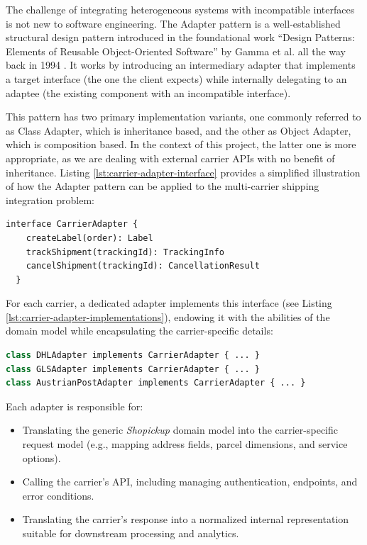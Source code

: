 \documentclass{imc-inf}
\begin{document}
The challenge of integrating heterogeneous systems with incompatible interfaces is not new to software engineering.
The Adapter pattern is a well-established structural design pattern introduced in the foundational work “Design Patterns: Elements of Reusable Object-Oriented Software” by Gamma et al. all the way back in 1994 \cite{gammaDesignPatternsElements1994}.
It works by introducing an intermediary adapter that implements a target interface (the one the client expects) while internally delegating to an adaptee (the existing component with an incompatible interface).

This pattern has two primary implementation variants, one commonly referred to as Class Adapter, which is inheritance based, and the other as Object Adapter, which is composition based.
In the context of this project, the latter one is more appropriate, as we are dealing with external carrier APIs with no benefit of inheritance.
Listing \ref{lst:carrier-adapter-interface} provides a simplified illustration of how the Adapter pattern can be applied to the multi-carrier shipping integration problem:

\begin{lstlisting}[language=Python,caption={Carrier adapter interface pseudocode},label=lst:carrier-adapter-interface]
interface CarrierAdapter {
    createLabel(order): Label
    trackShipment(trackingId): TrackingInfo
    cancelShipment(trackingId): CancellationResult
  }
\end{lstlisting}

For each carrier, a dedicated adapter implements this interface (see Listing \ref{lst:carrier-adapter-implementations}), endowing it with the abilities of the domain model while encapsulating the carrier-specific details:

\begin{lstlisting}[language=Python,caption={Carrier adapter implementation pseudocode},label=lst:carrier-adapter-implementations]
class DHLAdapter implements CarrierAdapter { ... }
class GLSAdapter implements CarrierAdapter { ... }
class AustrianPostAdapter implements CarrierAdapter { ... }
\end{lstlisting}

Each adapter is responsible for:

\begin{itemize}[itemsep=3pt]
  \item Translating the generic \textit{Shopickup} domain model into the carrier-specific request model (e.g., mapping address fields, parcel dimensions, and service options).
  \item Calling the carrier's API, including managing authentication, endpoints, and error conditions.
  \item Translating the carrier's response into a normalized internal representation suitable for downstream processing and analytics.
\end{itemize}
\end{document}
